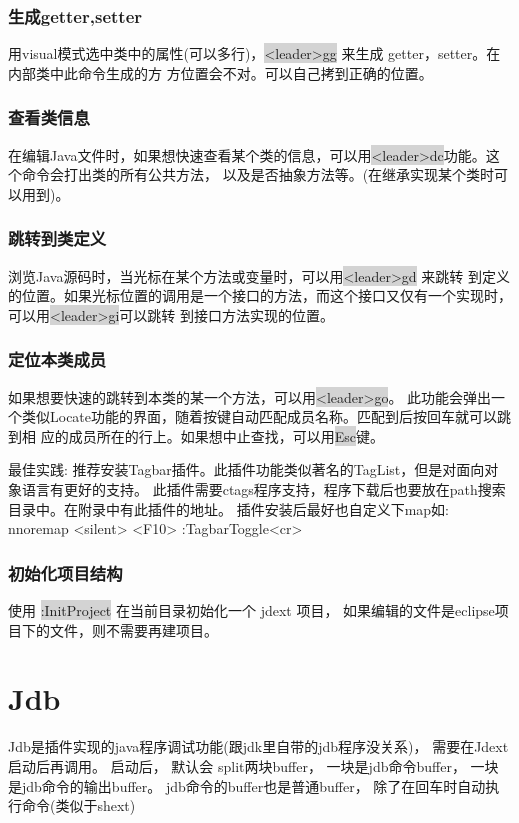 \documentclass[oneside,openany]{book}
\begin{document}
\subsubsection{生成getter,setter}
    用visual模式选中类中的属性(可以多行)，\colorbox{lightgray}{<leader>gg} 来生成 getter，setter。在内部类中此命令生成的方
方位置会不对。可以自己拷到正确的位置。

\subsubsection{查看类信息}
   在编辑Java文件时，如果想快速查看某个类的信息，可以用\colorbox{lightgray}{<leader>dc}功能。这个命令会打出类的所有公共方法，
以及是否抽象方法等。(在继承实现某个类时可以用到)。

\subsubsection{跳转到类定义}
浏览Java源码时，当光标在某个方法或变量时，可以用\colorbox{lightgray}{<leader>gd} 来跳转
到定义的位置。如果光标位置的调用是一个接口的方法，而这个接口又仅有一个实现时，可以用\colorbox{lightgray}{<leader>gi}可以跳转
到接口方法实现的位置。

\subsubsection{定位本类成员}
  如果想要快速的跳转到本类的某一个方法，可以用\colorbox{lightgray}{<leader>go}。
  此功能会弹出一个类似Locate功能的界面，随着按键自动匹配成员名称。匹配到后按回车就可以跳到相
  应的成员所在的行上。如果想中止查找，可以用\colorbox{lightgray}{Esc}键。
  \begin{mdframed}[style=BestPracticeFrame]
    最佳实践: 推荐安装Tagbar插件。此插件功能类似著名的TagList，但是对面向对象语言有更好的支持。
    此插件需要ctags程序支持，程序下载后也要放在path搜索目录中。在附录中有此插件的地址。
    插件安装后最好也自定义下map如:
      nnoremap <silent> <F10> :TagbarToggle<cr>
  \end{mdframed}

\subsubsection{初始化项目结构}
使用 \colorbox{lightgray}{:InitProject} 在当前目录初始化一个 jdext 项目， 如果编辑的文件是eclipse项目下的文件，则不需要再建项目。 

\section{Jdb}
    Jdb是插件实现的java程序调试功能(跟jdk里自带的jdb程序没关系)， 需要在Jdext启动后再调用。 启动后， 默认会 
    split两块buffer， 一块是jdb命令buffer， 一块是jdb命令的输出buffer。 jdb命令的buffer也是普通buffer， 除了在回车时自动执行命令(类似于shext) 
\end{document}
